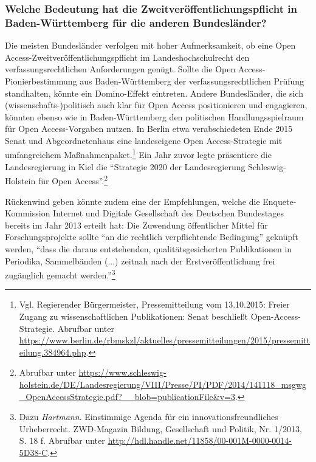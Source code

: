 \documentclass[a4paper,
fontsize=11pt,
oneside,
numbers=noperiodatend,
parskip=half-,
bibliography=totoc,
final
]{scrartcl}
\begin{document}
\hypertarget{welche-bedeutung-hat-die-zweitveruxf6ffentlichungspflicht-in-baden-wuxfcrttemberg-fuxfcr-die-anderen-bundesluxe4nder}{%
\subsubsection{Welche Bedeutung hat die Zweit\-ver\-öffent\-lich\-ungs\-pflicht in
Baden-Württemberg für die anderen
Bundesländer?}\label{welche-bedeutung-hat-die-zweitveruxf6ffentlichungspflicht-in-baden-wuxfcrttemberg-fuxfcr-die-anderen-bundesluxe4nder}}

Die meisten Bundesländer verfolgen mit hoher Aufmerksamkeit, ob eine
Open Access-Zweit\-ver\-öffent\-lich\-ungs\-pflicht im Landeshochschulrecht den
verfassungsrechtlichen Anforderungen genügt. Sollte die Open
Access-Pionierbestimmung aus Baden-Württemberg der
verfassungsrechtlichen Prüfung standhalten, könnte ein Domino-Effekt
eintreten. Andere Bundesländer, die sich (wissenschafts-)politisch auch
klar für Open Access positionieren und engagieren, könnten ebenso wie in
Baden-Württemberg den politischen Handlungsspielraum für Open
Access-Vorgaben nutzen. In Berlin etwa verabschiedeten Ende 2015 Senat
und Abgeordnetenhaus eine landeseigene Open Access-Strategie mit
umfangreichem Maßnahmenpaket.\footnote{Vgl. Regierender Bürgermeister,
  Pressemitteilung vom 13.10.2015: Freier Zugang zu wissenschaftlichen
  Publikationen: Senat beschließt Open-Access-Strategie. Abrufbar unter
  \url{https://www.berlin.de/rbmskzl/aktuelles/pressemitteilungen/2015/pressemitteilung.384964.php}.}
Ein Jahr zuvor legte präsentiere die Landesregierung in Kiel die
\enquote{Strategie 2020 der Landesregierung Schleswig-Holstein für Open
Access}.\footnote{Abrufbar unter
  \url{https://www.schleswig-holstein.de/DE/Landesregierung/VIII/Presse/PI/PDF/2014/141118_msgwg_OpenAccessStrategie.pdf?__blob=publicationFile\&v=3}.}

Rückenwind geben könnte zudem eine der Empfehlungen, welche die
Enquete-Kommission Internet und Digitale Gesellschaft des Deutschen
Bundestages bereits im Jahr 2013 erteilt hat: Die Zuwendung öffentlicher
Mittel für Forschungsprojekte sollte \enquote{an die rechtlich
verpflichtende Bedingung} geknüpft werden, \enquote{dass die daraus
entstehenden, qualitätsgesicherten Publikationen in Periodika,
Sammelbänden (...) zeitnah nach der Erstveröffentlichung frei zugänglich
gemacht werden.}\footnote{Dazu \emph{Hartmann}. Einstimmige Agenda für
  ein innovationsfreundliches Urheberrecht. ZWD-Magazin Bildung,
  Gesellschaft und Politik, Nr. 1/2013, S. 18 f. Abrufbar unter
  \url{http://hdl.handle.net/11858/00-001M-0000-0014-5D38-C}.}
\end{document}
